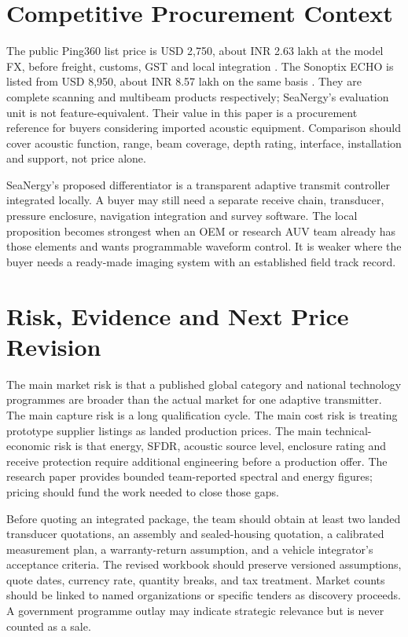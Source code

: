 \documentclass[11pt,a4paper]{article}
\begin{document}
\section{Competitive Procurement Context}
The public Ping360 list price is USD 2,750, about INR 2.63 lakh at the model FX, before freight, customs, GST and local integration \cite{ping}. The Sonoptix ECHO is listed from USD 8,950, about INR 8.57 lakh on the same basis \cite{echo}. They are complete scanning and multibeam products respectively; SeaNergy's evaluation unit is not feature-equivalent. Their value in this paper is a procurement reference for buyers considering imported acoustic equipment. Comparison should cover acoustic function, range, beam coverage, depth rating, interface, installation and support, not price alone.

SeaNergy's proposed differentiator is a transparent adaptive transmit controller integrated locally. A buyer may still need a separate receive chain, transducer, pressure enclosure, navigation integration and survey software. The local proposition becomes strongest when an OEM or research AUV team already has those elements and wants programmable waveform control. It is weaker where the buyer needs a ready-made imaging system with an established field track record.

\section{Risk, Evidence and Next Price Revision}
The main market risk is that a published global category and national technology programmes are broader than the actual market for one adaptive transmitter. The main capture risk is a long qualification cycle. The main cost risk is treating prototype supplier listings as landed production prices. The main technical-economic risk is that energy, SFDR, acoustic source level, enclosure rating and receive protection require additional engineering before a production offer. The research paper provides bounded team-reported spectral and energy figures; pricing should fund the work needed to close those gaps.

Before quoting an integrated package, the team should obtain at least two landed transducer quotations, an assembly and sealed-housing quotation, a calibrated measurement plan, a warranty-return assumption, and a vehicle integrator's acceptance criteria. The revised workbook should preserve versioned assumptions, quote dates, currency rate, quantity breaks, and tax treatment. Market counts should be linked to named organizations or specific tenders as discovery proceeds. A government programme outlay may indicate strategic relevance but is never counted as a sale.
\end{document}
